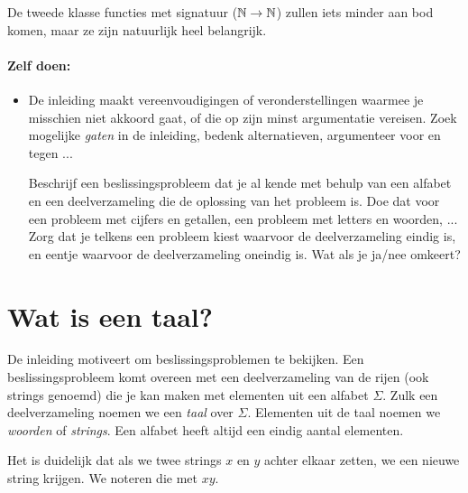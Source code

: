 De tweede klasse functies met signatuur ($\mathbb{N} \rightarrow \mathbb{N}$) zullen
iets minder aan bod komen, maar ze zijn natuurlijk heel belangrijk.

\newpage
\paragraph{Zelf doen:}
\begin{itemize}
\item[]

De inleiding maakt vereenvoudigingen of veronderstellingen waarmee je
misschien niet akkoord gaat, of die op zijn minst argumentatie
vereisen. Zoek mogelijke {\em gaten} in de inleiding, bedenk
alternatieven, argumenteer voor en tegen ...

Beschrijf een beslissingsprobleem dat je al kende met behulp van
een alfabet en een deelverzameling die de oplossing van het probleem
is. Doe dat voor een probleem met cijfers en getallen, een probleem
met letters en woorden, ... Zorg dat je telkens een probleem kiest
waarvoor de deelverzameling eindig is, en eentje waarvoor de
deelverzameling oneindig is. Wat als je ja/nee omkeert?

\end{itemize}

\section{Wat is een taal?}


De inleiding motiveert om beslissingsproblemen te bekijken. Een
beslissingsprobleem komt overeen met een deelverzameling van de rijen (ook
strings genoemd) die je kan maken met elementen uit een alfabet
$\Sigma$.  Zulk een deelverzameling noemen we een {\em taal} over
$\Sigma$. Elementen uit de taal noemen we {\em woorden} of {\em
strings}. Een alfabet heeft altijd een eindig aantal elementen.


Het is duidelijk dat als we twee strings $x$ en $y$ achter elkaar
zetten, we een nieuwe string krijgen. We noteren die met $xy$.



